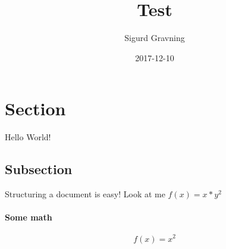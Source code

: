 \documentclass{article}
\title{Test}
\date{2017-12-10}
\author{Sigurd Gravning}
\begin{document}
\maketitle
{}
\newpage
{}

\section{Section}

Hello World!

\subsection{Subsection}

Structuring a document is easy!
Look at me $f(x) = x*y^2$

\paragraph{Some math}

\begin{equation*}
	f(x) = x^2
\end{equation*}
\end{document}
